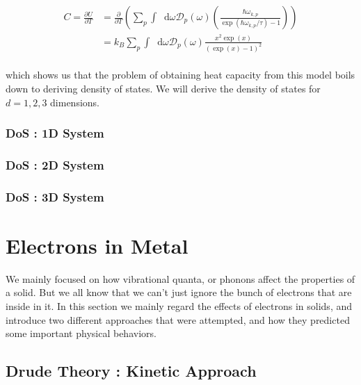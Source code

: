 \documentclass[paper=a4, fontsize=11pt]{scrartcl}
\newcommand{\boltz}{k_B}
\newcommand{\pder}[2]{\frac{\partial #1}{\partial #2}}
\newcommand*\dif{\mathop{}\!\mathrm{d}}
\begin{document}
\begin{equation}\nonumber
\begin{split}
	C = \pder{U}{T} &= \pder{}{T} \left( \sum_{p} \int \dif \omega \mathcal{D}_p(\omega) \left( \frac{\hbar \omega_{k,p} }{\exp(\hbar \omega_{k,p}  / \tau) - 1}  \right) \right) \\[2.5ex]
	&= \boltz  \sum_{p} \int \dif \omega \mathcal{D}_p(\omega) \frac{x^2 \exp(x)}{(\exp(x)-1)^2}
\end{split} 
\end{equation}\\

which shows us that the problem of obtaining heat capacity from this model boils down to deriving density of states. We will derive the density of states for $d=1,2,3$ dimensions.

\subsubsection{DoS : 1D System}

\subsubsection{DoS : 2D System}

\subsubsection{DoS : 3D System}

\vspace{0.25in}
\section{Electrons in Metal}
\vspace{0.25in}

We mainly focused on how vibrational quanta, or phonons affect the properties of a solid.  But we all know that we can't just ignore the bunch of electrons that are inside in it. In this section we mainly regard the effects of electrons in solids, and introduce two different approaches that were attempted, and how they predicted some important physical behaviors.

\vspace{0.15in}
\subsection{Drude Theory : Kinetic Approach}
\vspace{0.15in}
\end{document}
